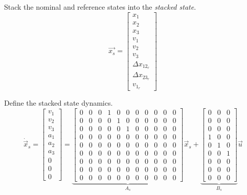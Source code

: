 \documentclass[12pt,onecolumn,reqno]{amsart}
\begin{document}
Stack the nominal and reference states into the \textit{stacked state}.
\begin{equation}
  \vec{x_{s}} = 
  \begin{bmatrix}
    x_{1}             \\
    x_{2}             \\
    x_{3}             \\
    v_{1}             \\
    v_{2}             \\
    v_{3}             \\ 
    \Delta x_{12_{r}} \\
    \Delta x_{23_{r}} \\
    v_{1_{r}}
  \end{bmatrix}
\end{equation}

Define the stacked state dynamics.
\begin{equation}
  \dot{\vec{x}}_{s} = 
  \begin{bmatrix}
    v_{1}             \\
    v_{2}             \\
    v_{3}             \\
    a_{1}             \\
    a_{2}             \\
    a_{3}             \\ 
    0                 \\
    0                 \\
    0
  \end{bmatrix}
  =
  \underbrace{
  \begin{bmatrix}
    0 & 0 & 0 & 1 & 0 & 0 & 0 & 0 & 0 & 0 & 0 \\
    0 & 0 & 0 & 0 & 1 & 0 & 0 & 0 & 0 & 0 & 0 \\
    0 & 0 & 0 & 0 & 0 & 1 & 0 & 0 & 0 & 0 & 0 \\
    0 & 0 & 0 & 0 & 0 & 0 & 0 & 0 & 0 & 0 & 0 \\
    0 & 0 & 0 & 0 & 0 & 0 & 0 & 0 & 0 & 0 & 0 \\
    0 & 0 & 0 & 0 & 0 & 0 & 0 & 0 & 0 & 0 & 0 \\
    0 & 0 & 0 & 0 & 0 & 0 & 0 & 0 & 0 & 0 & 0 \\
    0 & 0 & 0 & 0 & 0 & 0 & 0 & 0 & 0 & 0 & 0 \\
    0 & 0 & 0 & 0 & 0 & 0 & 0 & 0 & 0 & 0 & 0
  \end{bmatrix}
  }_{A_{s}}
  \vec{x}_{s}
  +
  \underbrace{
  \begin{bmatrix}
    0 & 0 & 0 \\
    0 & 0 & 0 \\
    0 & 0 & 0 \\
    1 & 0 & 0 \\
    0 & 1 & 0 \\
    0 & 0 & 1 \\
    0 & 0 & 0 \\
    0 & 0 & 0 \\
    0 & 0 & 0
  \end{bmatrix}
  }_{B_{s}}
  \vec{u}
\end{equation}
\end{document}
